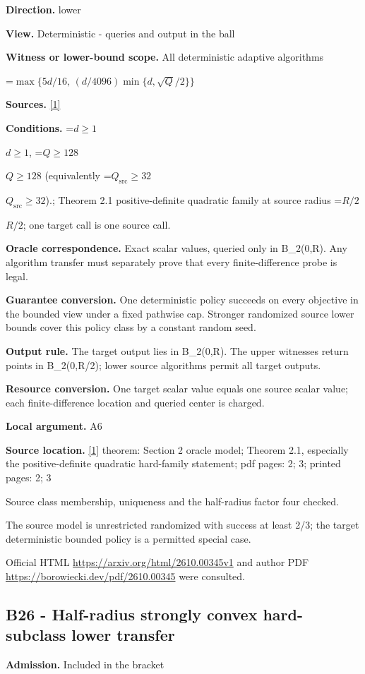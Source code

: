 \documentclass[10pt,a4paper]{article}
\newcommand{\AtlasMath}[1]{\par\begingroup\centering\setbox0=\hbox{$\displaystyle #1$}\ifdim\wd0>1.4\linewidth\typeout{ATLAS WIDE FORMULA: \the\wd0}\fi\ifdim\wd0>\linewidth\resizebox{\linewidth}{!}{\box0}\else\box0\fi\par\endgroup}
\newcommand{\AtlasInlineMath}[1]{\begingroup\setbox0=\hbox{$#1$}\ifdim\wd0>.4\linewidth\endgroup\AtlasMath{#1}\else\endgroup$#1$\fi}
\begin{document}
\textbf{Direction.} lower

\textbf{View.} Deterministic - queries and output in the ball

\textbf{Witness or lower-bound scope.} All deterministic adaptive algorithms

\AtlasMath{\max\{5d/16,\,(d/4096)\min\{d,\sqrt Q/2\}\}}
\textbf{Sources.} \href{https://arxiv.org/html/2610.00345v1}{[1]}

\textbf{Conditions.} \AtlasInlineMath{d\ge1}, \AtlasInlineMath{Q\ge128} (equivalently \AtlasInlineMath{Q_{\mathrm{src}}\ge32}).; Theorem 2.1 positive-definite quadratic family at source radius \AtlasInlineMath{R/2}; one target call is one source call.

\textbf{Oracle correspondence.} Exact scalar values, queried only in B\_2(0,R). Any algorithm transfer must separately prove that every finite-difference probe is legal.

\textbf{Guarantee conversion.} One deterministic policy succeeds on every objective in the bounded view under a fixed pathwise cap. Stronger randomized source lower bounds cover this policy class by a constant random seed.

\textbf{Output rule.} The target output lies in B\_2(0,R). The upper witnesses return points in B\_2(0,R/2); lower source algorithms permit all target outputs.

\textbf{Resource conversion.} One target scalar value equals one source scalar value; each finite-difference location and queried center is charged.

\textbf{Local argument.} A6

\textbf{Source location.} \href{https://arxiv.org/html/2610.00345v1}{[1]} theorem: Section 2 oracle model; Theorem 2.1, especially the positive-definite quadratic hard-family statement; pdf pages: 2; 3; printed pages: 2; 3

Source class membership, uniqueness and the half-radius factor four checked.

The source model is unrestricted randomized with success at least 2/3; the target deterministic bounded policy is a permitted special case.

Official HTML \url{https://arxiv.org/html/2610.00345v1} and author PDF \url{https://borowiecki.dev/pdf/2610.00345} were consulted.

\subsection{B26 - Half-radius strongly convex hard-subclass lower transfer}
\textbf{Admission.} Included in the bracket
\end{document}
